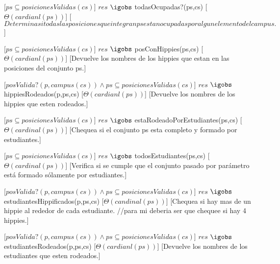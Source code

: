  [$ps \subseteq posicionesValidas(cs)$] 
  {$res$ $\igobs$ todasOcupadas?(ps,cs)}
  [$\Theta(cardianl(ps))$]
  [$Determina si todas las posiciones que integran ps estan ocupadas por algun elemento del campus.$]
  
  [$ps \subseteq posicionesValidas(cs)$]
  {$res$ $\igobs$ posConHippies(ps,cs)}
  [$\Theta(cardianl(ps))$]
  [Devuelve los nombres de los hippies que estan en las posiciones del conjunto ps.]  

  [$posValida?(p,campus(cs)) \land ps \subseteq posicionesValidas(cs)$]
  {$res$ $\igobs$ hippiesRodeados(p,ps,cs)}
  [$\Theta(cardianl(ps))$] %
  [Devuelve los nombres de los hippies que esten rodeados.]  

  [$ps \subseteq posicionesValidas(cs)$]
  {$res$ $\igobs$ estaRodeadoPorEstudiantes(ps,cs)}
  [$\Theta(cardinal(ps))$]
  [Chequea si el conjunto ps esta completo y formado por estudiantes.]  

  [$ps \subseteq posicionesValidas(cs)$]
  {$res$ $\igobs$ todosEstudiantes(ps,cs)}
  [$\Theta(cardinal(ps))$]
  [Verifica si se cumple que el conjunto pasado por parámetro está formado sólamente por estudiantes.]  

  [$posValida?(p,campus(cs)) \land ps \subseteq posicionesValidas(cs)$]
  {$res$ $\igobs$ estudiantesHippificados(p,ps,cs)}
  [$\Theta(candinal(ps))$]
  [Chequea si hay mas de un hippie al rededor de cada estudiante. //para mi deberia ser que chequee si hay 4 hippies.]  

  [$posValida?(p,campus(cs)) \land ps \subseteq posicionesValidas(cs)$]
  {$res$ $\igobs$ estudiantesRodeados(p,ps,cs)}
  [$\Theta(cardianl(ps))$]
  [Devuelve los nombres de los estudiantes que esten rodeados.]  

